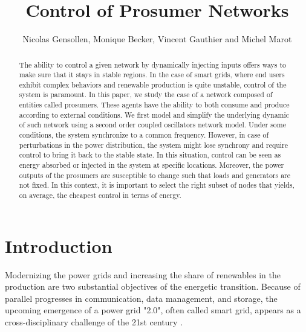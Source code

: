 \documentclass[conference]{IEEEtran}
\begin{document}
\pagestyle{plain}
\title{Control of Prosumer Networks}


\author{Nicolas Gensollen, Monique Becker, Vincent Gauthier and Michel Marot  \\
}


\maketitle


\begin{abstract}
The ability to control a given network by  dynamically injecting inputs offers ways to make sure that it stays in stable regions. In the case of smart grids, where end users exhibit complex behaviors and renewable production is quite unstable, control of the system  is paramount. In this paper, we study the case of a network composed of entities called prosumers. These agents have the ability to both consume and produce according to external conditions. We first model and simplify the underlying dynamic of such network using a second order coupled oscillators network model. Under some conditions, the system synchronize to a common frequency. However, in case of perturbations in the power distribution, the system might lose synchrony and require control to bring it back to the stable state. In this situation, control can be seen as energy  absorbed or injected in the system at specific locations. Moreover, the power outputs of the prosumers are susceptible to change such that loads and generators are not fixed. In this context, it is important to select the right subset of nodes that yields, on average, the cheapest control in terms of energy. 
\end{abstract}


\IEEEpeerreviewmaketitle


\section{Introduction}
\label{sec:introduction}

Modernizing the power grids and increasing the share of renewables in the production are two substantial objectives of the energetic transition. Because of parallel progresses in communication, data management, and storage, the upcoming emergence of a power grid "2.0", often called smart grid, appears as a cross-disciplinary challenge of the 21st century \cite{Ramchurn}.
\end{document}
